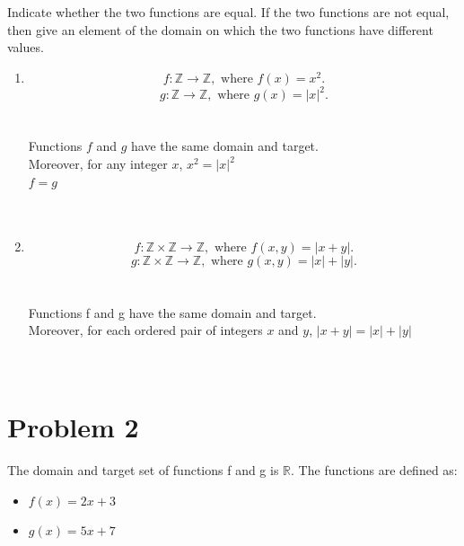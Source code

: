 \documentclass{amsart}
\theoremstyle{definition}
\theoremstyle{Exercise}
\theoremstyle{remark}
\theoremstyle{rule}
\numberwithin{equation}{section}
\newcommand{\Z}{\mathbb Z}
\begin{document}
Indicate whether the two functions are equal. If the two functions are not equal, then give an element of the domain on which the two functions have different values.\\
 \begin{enumerate}[label=(\alph*)]
   \item
\[ f: \Z \to \Z, \text{ where } f(x)= x^2.\]
\[ g: \Z \to \Z, \text{ where } g(x)= |x|^2.\]\\\\
Functions $f$ and $g$ have the same domain and target.\\
Moreover, for any integer $x$, $x^2 = |x|^2$\\
$f = g$\\
\\\\
\item  \[ f: \Z\times \Z \to \Z, \text{ where } f(x,y)= |x+y|.\]
\[ g: \Z\times \Z \to \Z, \text{ where } g(x,y)= |x|+|y|.\]\\\\
Functions f and g have the same domain and target.\\
Moreover, for each ordered pair of integers $x$ and $y$, $|x+y| = |x|+|y|$\\
\\\\
\end{enumerate}

 \newpage

\section*{Problem 2}

The domain and target set of functions f and g is $\mathbb{R}$. The functions are defined as:
\begin{itemize}
  \item $f(x) = 2x + 3$\\

  \item $g(x) = 5x + 7$\\


\end{itemize}
\end{document}

